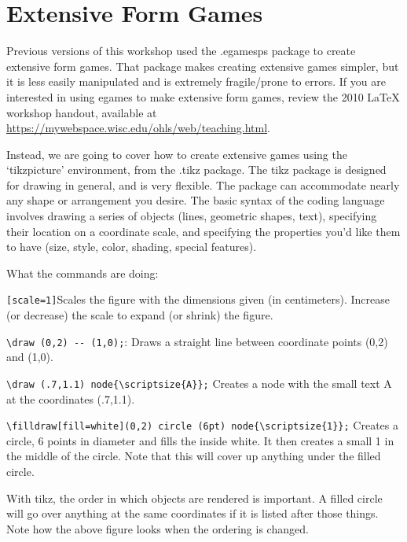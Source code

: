 \documentclass[10.5pt]{article}
\begin{document}
\section{Extensive Form Games}
Previous versions of this workshop used the .egamesps package to create extensive form games. That package makes creating extensive games simpler, but it is less easily manipulated and is extremely fragile/prone to errors. If you are interested in using egames to make extensive form games, review the 2010 LaTeX workshop handout, available at \href{https://mywebspace.wisc.edu/ohls/web/teaching.html}{https://mywebspace.wisc.edu/ohls/web/teaching.html}.

Instead, we are going to cover how to create extensive games using the `tikzpicture' environment, from the .tikz package. The tikz package is designed for drawing in general, and is very flexible. The package can accommodate nearly any shape or arrangement you desire. The basic syntax of the coding language involves drawing a series of objects (lines, geometric shapes, text), specifying their location on a coordinate scale, and specifying the properties you'd like them to have (size, style, color, shading, special features). 


\begin{center}
\end{center}

What the commands are doing: \\

\begin{compactitem}
\item \verb+[scale=1]+Scales the figure with the dimensions given (in centimeters).  Increase (or decrease) the scale to expand (or shrink) the figure.
\item \verb+\draw (0,2) -- (1,0);+: Draws a straight line between coordinate points (0,2) and (1,0).
\item \verb+\draw (.7,1.1) node{\scriptsize{A}};+ Creates a node with the small text A at the coordinates (.7,1.1).
\item \verb+\filldraw[fill=white](0,2) circle (6pt) node{\scriptsize{1}};+ Creates a circle, 6 points in diameter and fills the inside white. It then creates a small 1 in the middle of the circle. Note that this will cover up anything under the filled circle. 
\end{compactitem}
\vspace{.5cm}
With tikz, the order in which objects are rendered is important. A filled circle will go over anything at the same coordinates if it is listed after those things. Note how the above figure looks when the ordering is changed.
\end{document}
